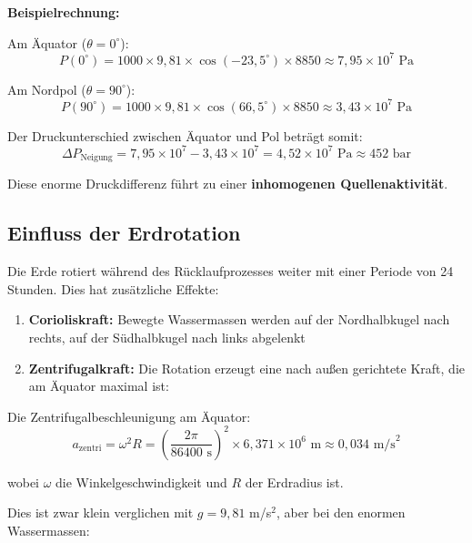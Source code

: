 ﻿\documentclass[12pt,a4paper]{report}
\begin{document}
\textbf{Beispielrechnung:}

Am Äquator ($\theta = 0^\circ$):
\begin{equation}
	P(0^\circ) = 1000 \times 9{,}81 \times \cos(-23{,}5^\circ) \times 8850 \approx 7{,}95 \times 10^7 \text{ Pa}
\end{equation}

Am Nordpol ($\theta = 90^\circ$):
\begin{equation}
	P(90^\circ) = 1000 \times 9{,}81 \times \cos(66{,}5^\circ) \times 8850 \approx 3{,}43 \times 10^7 \text{ Pa}
\end{equation}

Der Druckunterschied zwischen Äquator und Pol beträgt somit:
\begin{equation}
	\Delta P_{\text{Neigung}} = 7{,}95 \times 10^7 - 3{,}43 \times 10^7 = 4{,}52 \times 10^7 \text{ Pa} \approx 452 \text{ bar}
\end{equation}

Diese enorme Druckdifferenz führt zu einer \textbf{inhomogenen Quellenaktivität}.

\subsection{Einfluss der Erdrotation}

Die Erde rotiert während des Rücklaufprozesses weiter mit einer Periode von 24 Stunden. Dies hat zusätzliche Effekte:

\begin{enumerate}
	\item \textbf{Corioliskraft:} Bewegte Wassermassen werden auf der Nordhalbkugel nach rechts, auf der Südhalbkugel nach links abgelenkt
	
	\item \textbf{Zentrifugalkraft:} Die Rotation erzeugt eine nach außen gerichtete Kraft, die am Äquator maximal ist:
\end{enumerate}

Die Zentrifugalbeschleunigung am Äquator:
\begin{equation}
	a_{\text{zentri}} = \omega^2 R = \left(\frac{2\pi}{86400 \text{ s}}\right)^2 \times 6{,}371 \times 10^6 \text{ m} \approx 0{,}034 \text{ m/s}^2
\end{equation}

wobei $\omega$ die Winkelgeschwindigkeit und $R$ der Erdradius ist.

Dies ist zwar klein verglichen mit $g = 9{,}81$ m/s$^2$, aber bei den enormen Wassermassen:
\end{document}
